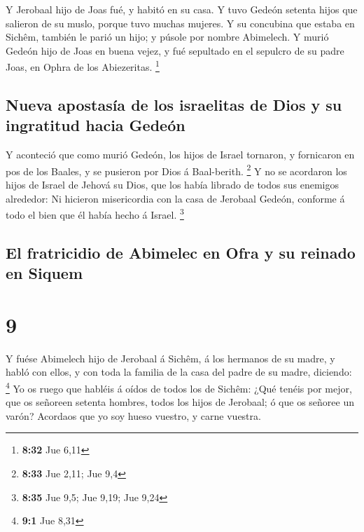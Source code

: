 Y Jerobaal hijo de Joas fué, y habitó en su casa.
 Y tuvo Gedeón setenta hijos que salieron de su muslo,
porque tuvo muchas mujeres.  Y su concubina que estaba en
Sichêm, también le parió un hijo; y púsole por nombre Abimelech.
 Y murió Gedeón hijo de Joas en buena vejez, y fué
sepultado en el sepulcro de su padre Joas, en Ophra de los Abiezeritas.
\footnote{\textbf{8:32} Jue 6,11}

\hypertarget{nueva-apostasuxeda-de-los-israelitas-de-dios-y-su-ingratitud-hacia-gedeuxf3n}{%
\subsection{Nueva apostasía de los israelitas de Dios y su ingratitud
hacia
Gedeón}\label{nueva-apostasuxeda-de-los-israelitas-de-dios-y-su-ingratitud-hacia-gedeuxf3n}}

 Y aconteció que como murió Gedeón, los hijos de Israel
tornaron, y fornicaron en pos de los Baales, y se pusieron por Dios á
Baal-berith. \footnote{\textbf{8:33} Jue 2,11; Jue 9,4}  Y
no se acordaron los hijos de Israel de Jehová su Dios, que los había
librado de todos sus enemigos alrededor:  Ni hicieron
misericordia con la casa de Jerobaal Gedeón, conforme á todo el bien que
él había hecho á Israel. \footnote{\textbf{8:35} Jue 9,5; Jue 9,19; Jue
  9,24}

\hypertarget{el-fratricidio-de-abimelec-en-ofra-y-su-reinado-en-siquem}{%
\subsection{El fratricidio de Abimelec en Ofra y su reinado en
Siquem}\label{el-fratricidio-de-abimelec-en-ofra-y-su-reinado-en-siquem}}

\hypertarget{section-8}{%
\section{9}\label{section-8}}

 Y fuése Abimelech hijo de Jerobaal á Sichêm, á los hermanos
de su madre, y habló con ellos, y con toda la familia de la casa del
padre de su madre, diciendo: \footnote{\textbf{9:1} Jue 8,31}
 Yo os ruego que habléis á oídos de todos los de Sichêm:
¿Qué tenéis por mejor, que os señoreen setenta hombres, todos los hijos
de Jerobaal; ó que os señoree un varón? Acordaos que yo soy hueso
vuestro, y carne vuestra.

